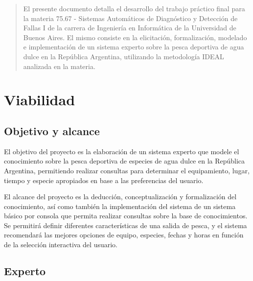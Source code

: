 \documentclass[a4paper,11pt]{article}
\begin{document}
\begin{abstract}

  El presente documento detalla el desarrollo del trabajo práctico final para
  la materia 75.67 - Sistemas Automáticos de Diagnóstico y Detección de Fallas
  I de la carrera de Ingeniería en Informática de la Universidad de Buenos
  Aires. El mismo consiste en la elicitación, formalización, modelado e
  implementación de un sistema experto sobre la pesca deportiva de agua dulce
  en la República Argentina, utilizando la metodología IDEAL analizada en la
  materia.

\end{abstract}
\clearpage

\tableofcontents
\clearpage

\section{Viabilidad}

\subsection{Objetivo y alcance}

El objetivo del proyecto es la elaboración de un sistema experto que modele el
conocimiento sobre la pesca deportiva de especies de agua dulce en la República
Argentina, permitiendo realizar consultas para determinar el equipamiento,
lugar, tiempo y especie apropiados en base a las preferencias del usuario.

El alcance del proyecto es la deducción, conceptualización y formalización del
conocimiento, así como también la implementación del sistema de un sistema
básico por consola que permita realizar consultas sobre la base de
conocimientos. Se permitirá definir diferentes características de una salida de
pesca, y el sistema recomendará las mejores opciones de equipo, especies,
fechas y horas en función de la selección interactiva del usuario.

\subsection{Experto}
\end{document}
